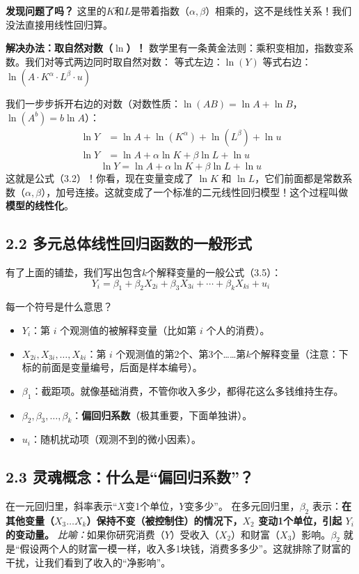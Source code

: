 \documentclass[12pt,a4paper]{ctexart}
\begin{document}
\textbf{发现问题了吗？} 这里的\(K\)和\(L\)是带着指数（\(\alpha, \beta\)）相乘的，这不是线性关系！我们没法直接用线性回归算。

\textbf{解决办法：取自然对数（\(\ln\)）！}
数学里有一条黄金法则：乘积变相加，指数变系数。我们对等式两边同时取自然对数：
等式左边：\(\ln(Y)\)
等式右边：\(\ln(A \cdot K^\alpha \cdot L^\beta \cdot u)\)

我们一步步拆开右边的对数（对数性质：\(\ln(AB) = \ln A + \ln B\)，\(\ln(A^b) = b\ln A\)）：
\begin{align*}
\ln Y &= \ln A + \ln(K^\alpha) + \ln(L^\beta) + \ln u \\
\ln Y &= \ln A + \alpha \ln K + \beta \ln L + \ln u
\end{align*}
\begin{equation*}
\ln Y = \ln A + \alpha \ln K + \beta \ln L + \ln u \tag{3.2}
\end{equation*}
这就是公式（3.2）！你看，现在变量变成了 \(\ln K\) 和 \(\ln L\)，它们前面都是常数系数（\(\alpha, \beta\)），加号连接。这就变成了一个标准的二元线性回归模型！这个过程叫做\textbf{模型的线性化}。

\subsection*{2.2 多元总体线性回归函数的一般形式}
有了上面的铺垫，我们写出包含\(k\)个解释变量的一般公式（3.5）：
\begin{equation*}
Y_i = \beta_1 + \beta_2 X_{2i} + \beta_3 X_{3i} + \cdots + \beta_k X_{ki} + u_i \tag{3.5}
\end{equation*}

每一个符号是什么意思？
\begin{itemize}
\item \textbf{\(Y_i\)}：第 \(i\) 个观测值的被解释变量（比如第 \(i\) 个人的消费）。
\item \textbf{\(X_{2i}, X_{3i}, \dots, X_{ki}\)}：第 \(i\) 个观测值的第2个、第3个……第\(k\)个解释变量（注意：下标的前面是变量编号，后面是样本编号）。
\item \textbf{\(\beta_1\)}：截距项。就像基础消费，不管你收入多少，都得花这么多钱维持生存。
\item \textbf{\(\beta_2, \beta_3, \dots, \beta_k\)}：\textbf{偏回归系数}（极其重要，下面单独讲）。
\item \textbf{\(u_i\)}：随机扰动项（观测不到的微小因素）。
\end{itemize}

\subsection*{2.3 灵魂概念：什么是“偏回归系数”？}
在一元回归里，斜率表示“\(X\)变1个单位，\(Y\)变多少”。
在多元回归里，\(\beta_2\) 表示：\textbf{在其他变量（\(X_3\dots X_k\)）保持不变（被控制住）的情况下，\(X_2\) 变动1个单位，引起 \(Y_i\) 的变动量。}
\emph{比喻：}如果你研究消费（\(Y\)）受收入（\(X_2\)）和财富（\(X_3\)）影响。\(\beta_2\) 就是“假设两个人的财富一模一样，收入多1块钱，消费多多少”。这就排除了财富的干扰，让我们看到了收入的“净影响”。
\end{document}
